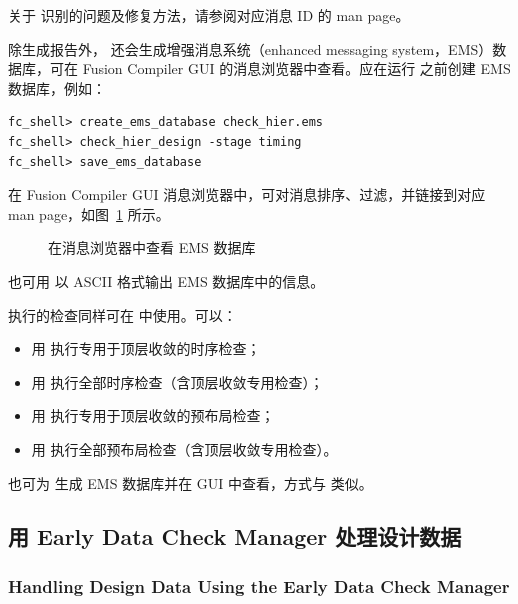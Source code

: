 关于  识别的问题及修复方法，请参阅对应消息 ID 的 man page。

除生成报告外， 还会生成增强消息系统（enhanced messaging system，EMS）数据库，可在 Fusion Compiler GUI 的消息浏览器中查看。应在运行  之前创建 EMS 数据库，例如：
\begin{lstlisting}
fc_shell> create_ems_database check_hier.ems
fc_shell> check_hier_design -stage timing
fc_shell> save_ems_database
\end{lstlisting}

在 Fusion Compiler GUI 消息浏览器中，可对消息排序、过滤，并链接到对应 man page，如图~\ref{fig:hier-ems-browser} 所示。

\begin{figure}[htbp]
\centering
{}
\caption{在消息浏览器中查看 EMS 数据库}
\label{fig:hier-ems-browser}
\end{figure}

也可用  以 ASCII 格式输出 EMS 数据库中的信息。

 执行的检查同样可在  中使用。可以：
\begin{itemize}
  \item 用  执行专用于顶层收敛的时序检查；
  \item 用  执行全部时序检查（含顶层收敛专用检查）；
  \item 用  执行专用于顶层收敛的预布局检查；
  \item 用  执行全部预布局检查（含顶层收敛专用检查）。
\end{itemize}

也可为  生成 EMS 数据库并在 GUI 中查看，方式与  类似。

\subsection{用 Early Data Check Manager 处理设计数据}
\subsubsection*{Handling Design Data Using the Early Data Check Manager}

